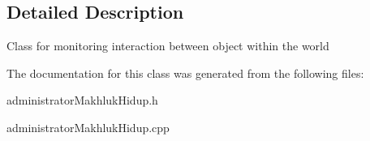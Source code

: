 \subsection{Detailed Description}
Class for monitoring interaction between object within the world 

The documentation for this class was generated from the following files\+:\begin{DoxyCompactItemize}
\item 
administrator\+Makhluk\+Hidup.\+h\item 
administrator\+Makhluk\+Hidup.\+cpp\end{DoxyCompactItemize}
